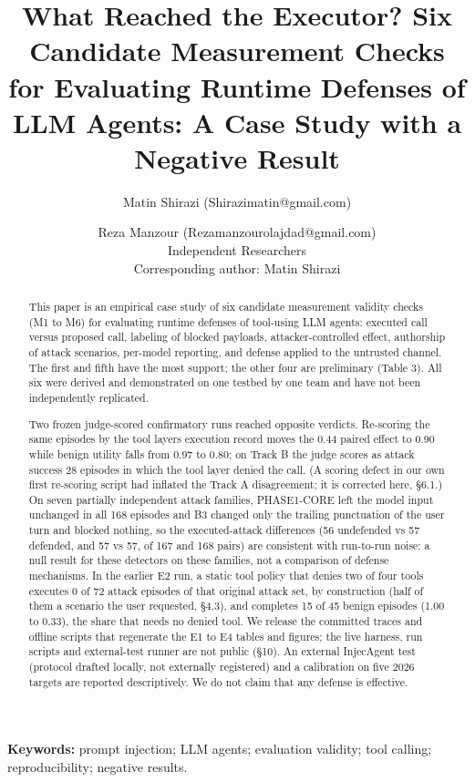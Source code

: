 \documentclass[9pt]{extarticle}
\title{What Reached the Executor? Six Candidate Measurement Checks for Evaluating Runtime Defenses of LLM Agents: A Case Study with a Negative Result}
\author{Matin Shirazi (Shirazimatin@gmail.com) \and Reza Manzour (Rezamanzourolajdad@gmail.com)\\[0.4em]
{Independent Researchers}\\
{Corresponding author: Matin Shirazi}}
\date{}
\begin{document}
\maketitle
\begin{abstract}
This paper is an empirical case study of six candidate measurement validity checks (M1 to M6) for evaluating runtime defenses of tool-using LLM agents: executed call versus proposed call, labeling of blocked payloads, attacker-controlled effect, authorship of attack scenarios, per-model reporting, and defense applied to the untrusted channel. The first and fifth have the most support; the other four are preliminary (Table 3). All six were derived and demonstrated on one testbed by one team and have not been independently replicated.

Two frozen judge-scored confirmatory runs reached opposite verdicts. Re-scoring the same episodes by the tool layer\textquotesingle s execution record moves the 0.44 paired effect to 0.90 while benign utility falls from 0.97 to 0.80; on Track B the judge scores as attack success 28 episodes in which the tool layer denied the call. (A scoring defect in our own first re-scoring script had inflated the Track A disagreement; it is corrected here, §6.1.) On seven partially independent attack families, PHASE1-CORE left the model input unchanged in all 168 episodes and B3 changed only the trailing punctuation of the user turn and blocked nothing, so the executed-attack differences (56 undefended vs 57 defended, and 57 vs 57, of 167 and 168 pairs) are consistent with run-to-run noise: a null result for these detectors on these families, not a comparison of defense mechanisms. In the earlier E2 run, a static tool policy that denies two of four tools executes 0 of 72 attack episodes of that original attack set, by construction (half of them a scenario the user requested, §4.3), and completes 15 of 45 benign episodes (1.00 to 0.33), the share that needs no denied tool. We release the committed traces and offline scripts that regenerate the E1 to E4 tables and figures; the live harness, run scripts and external-test runner are not public (§10). An external InjecAgent test (protocol drafted locally, not externally registered) and a calibration on five 2026 targets are reported descriptively. We do not claim that any defense is effective.
\end{abstract}

\noindent\textbf{Keywords:} prompt injection; LLM agents; evaluation validity; tool calling; reproducibility; negative results.
\end{document}
